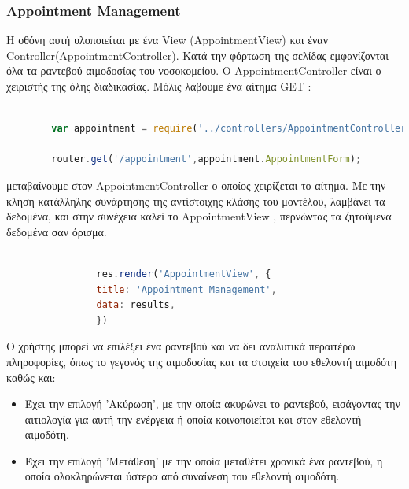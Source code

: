 		
						\subsubsection{Appointment Management}
		
	Η οθόνη αυτή υλοποιείται με ένα View (AppointmentView) και έναν Controller(AppointmentController). Κατά την φόρτωση της σελίδας εμφανίζονται όλα τα ραντεβού αιμοδοσίας του νοσοκομείου. O AppointmentController είναι ο χειριστής της όλης διαδικασίας. Μόλις λάβουμε ένα αίτημα GET :
		
		\begin{lstlisting}[language=Javascript]			
		
		var appointment = require('../controllers/AppointmentController');
		
		router.get('/appointment',appointment.AppointmentForm);  


		\end{lstlisting}
		
μεταβαίνουμε στον AppointmentController ο οποίος χειρίζεται το αίτημα. Με την κλήση κατάλληλης συνάρτησης της αντίστοιχης κλάσης του μοντέλου, λαμβάνει τα δεδομένα,  και στην συνέχεια καλεί το AppointmentView , περνώντας τα ζητούμενα δεδομένα σαν όρισμα.



		\begin{lstlisting}[language=Javascript]			
		
	            res.render('AppointmentView', { 
                title: 'Appointment Management',
                data: results,
				})

		\end{lstlisting}
		
		Ο χρήστης μπορεί να επιλέξει ένα ραντεβού και να δει αναλυτικά περαιτέρω πληροφορίες, όπως το γεγονός της αιμοδοσίας και  τα στοιχεία του εθελοντή αιμοδότη καθώς και:
		
		\begin{itemize}
		\item Έχει την επιλογή 'Ακύρωση', με την οποία ακυρώνει το ραντεβού, εισάγοντας την αιτιολογία για αυτή την ενέργεια ή οποία κοινοποιείται και στον εθελοντή αιμοδότη.
		
		\item Έχει την επιλογή 'Μετάθεση' με την οποία μεταθέτει χρονικά ένα ραντεβού, η οποία ολοκληρώνεται ύστερα από συναίνεση του εθελοντή αιμοδότη.		
		\end{itemize}

		

